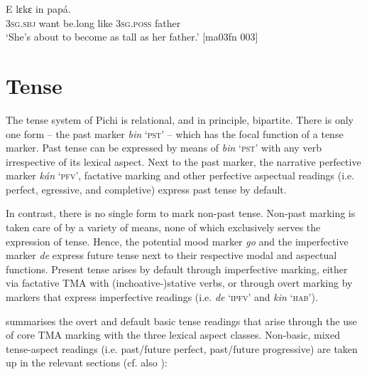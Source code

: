 \ea%
    \label{ex:key:373}
    \gll E         lɛkɛ  in    papá.\\
\textsc{3sg.sbj}  want  be.long  like  \textsc{3sg.poss}  father\\

\glt ‘She’s about to become as tall as her father.’ [ma03fn 003]
\z

\section{Tense}\label{sec:6.5}

The tense system of Pichi is relational, and in principle, bipartite. There is only one form – the past marker \textit{bin} ‘\textsc{pst’} – which has the focal function of a tense marker. Past tense can be expressed by means of \textit{bin} ‘\textsc{pst}’ with any verb irrespective of its lexical aspect. Next to the past marker, the narrative perfective marker \textit{kán} ‘\textsc{pfv}’, factative marking and other perfective aspectual readings (i.e. perfect, egressive, and completive) express past tense by default. 


In contrast, there is no single form to mark non-past tense. Non-past marking is taken care of by a variety of means, none of which exclusively serves the expression of tense. Hence, the potential mood marker \textit{go} and the imperfective marker \textit{de} express future tense next to their respective modal and aspectual functions. Present tense arises by default through imperfective marking, either via factative TMA with (inchoative-)stative verbs, or through overt marking by markers that express imperfective readings (i.e. \textit{de} ‘\textsc{ipfv}’ and \textit{kin} ‘\textsc{hab}’). 


 summarises the overt and default basic tense readings that arise through the use of core TMA marking with the three lexical aspect classes. Non-basic, mixed tense-aspect readings (i.e. past/future perfect, past/future progressive) are taken up in the relevant sections (cf. also ):

